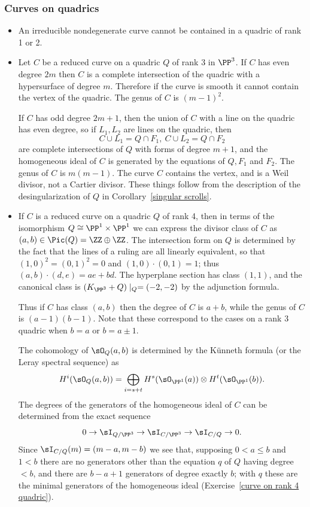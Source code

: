 \subsubsection{Curves on quadrics}\label{curves on quadrics}
\begin{itemize}

\item An irreducible nondegenerate  curve cannot be contained in a quadric of rank 1 or 2.

\item Let $C$ be a reduced curve on a quadric $Q$ of rank 3 in $\PP^{3}$. 
If $C$ has even degree $2m$ then $C$ is a complete intersection
of the quadric with a hypersurface of degree $m$. Therefore if the curve is smooth it cannot contain the vertex of the quadric. The genus of $C$ is $(m-1)^{2}$.

If $C$ has odd degree $2m+1$, then the union of $C$ with a line on the quadric has even degree,
so if $L_{1}, L_{2}$ are lines on the quadric, then 
$$
C\cup L_{1} = Q\cap F_{1}, \ C\cup L_{2} = Q\cap F_{2}
$$
are complete intersections of $Q$ with forms of degree $m+1$, and the homogeneous ideal of $C$ is generated by the equations
of $Q,F_{1}$ and $F_{2}$. The genus of $C$ is $m(m-1)$. The curve $C$ contains the vertex, and is a 
Weil divisor, not a Cartier divisor. These things follow from the description of the desingularization
of $Q$ in Corollary~\ref{singular scrolls}.

\item If $C$ is a reduced curve on a quadric $Q$ of rank 4, then in terms of the isomorphism
$Q \cong \PP^{1}\times \PP^{1}$ we can express the divisor class of $C$ as $(a,b)\in \Pic(Q) = \ZZ\oplus \ZZ$.
The intersection form on $Q$ is determined by the fact that the lines of a ruling are all linearly equivalent,
so that $(1,0)^{2} = (0,1)^2=0$ and $(1,0)\cdot (0,1) = 1$; thus $(a,b)\cdot (d,e) = ae+bd$. The hyperplane section
has class $(1,1)$, and the canonical class is $(K_{\PP^{3}}+Q)\mid_{Q} = (-2,-2)$ by the adjunction formula. 

Thus
if $C$ has class $(a,b)$ then the degree of $C$ is $a+b$, while the genus of $C$ is $(a-1)(b-1)$. Note that these correspond
to the cases on a rank 3 quadric when $b = a$ or $b = a\pm 1$. 


The cohomology of $\sO_{Q}(a,b)$ is determined by the K\"unneth formula (or the Leray spectral sequence) as
$$
H^{i}(\sO_{Q}(a,b)) = \bigoplus_{i = s+t}H^{s}(\sO_{\PP^{1}}(a))\otimes H^{t}(\sO_{\PP^{1}}(b)).
$$
The degrees of the generators of the homogeneous ideal of $C$ can be determined from the exact sequence
$$
0\to \sI_{Q/\PP^{3}} \to \sI_{C/\PP^{3}} \to \sI_{C/Q} \to 0.
$$
Since $ \sI_{C/Q} (m) = (m-a,m-b)$ we see that, supposing $0<a\leq b$ and $1<b$
there are no generators other than the equation $q$ of $Q$ having degree $<b$, and there are 
$b-a+1$ generators of degree exactly $b$; with $q$ these are the minimal generators of the homogeneous
ideal (Exercise~\ref{curve on rank 4 quadric}).
\end{itemize}



